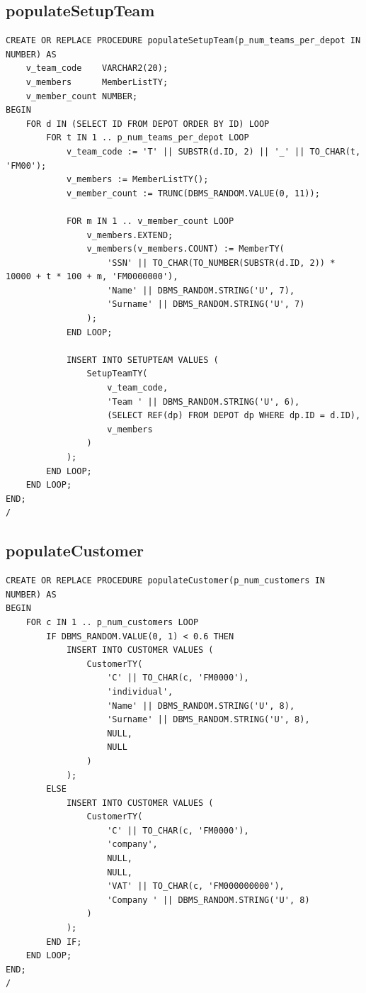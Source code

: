 \subsection*{populateSetupTeam}

\begin{lstlisting}
CREATE OR REPLACE PROCEDURE populateSetupTeam(p_num_teams_per_depot IN NUMBER) AS
    v_team_code    VARCHAR2(20);
    v_members      MemberListTY;
    v_member_count NUMBER;
BEGIN
    FOR d IN (SELECT ID FROM DEPOT ORDER BY ID) LOOP
        FOR t IN 1 .. p_num_teams_per_depot LOOP
            v_team_code := 'T' || SUBSTR(d.ID, 2) || '_' || TO_CHAR(t, 'FM00');
            v_members := MemberListTY();
            v_member_count := TRUNC(DBMS_RANDOM.VALUE(0, 11));

            FOR m IN 1 .. v_member_count LOOP
                v_members.EXTEND;
                v_members(v_members.COUNT) := MemberTY(
                    'SSN' || TO_CHAR(TO_NUMBER(SUBSTR(d.ID, 2)) * 10000 + t * 100 + m, 'FM0000000'),
                    'Name' || DBMS_RANDOM.STRING('U', 7),
                    'Surname' || DBMS_RANDOM.STRING('U', 7)
                );
            END LOOP;

            INSERT INTO SETUPTEAM VALUES (
                SetupTeamTY(
                    v_team_code,
                    'Team ' || DBMS_RANDOM.STRING('U', 6),
                    (SELECT REF(dp) FROM DEPOT dp WHERE dp.ID = d.ID),
                    v_members
                )
            );
        END LOOP;
    END LOOP;
END;
/
\end{lstlisting}

\subsection*{populateCustomer}

\begin{lstlisting}
CREATE OR REPLACE PROCEDURE populateCustomer(p_num_customers IN NUMBER) AS
BEGIN
    FOR c IN 1 .. p_num_customers LOOP
        IF DBMS_RANDOM.VALUE(0, 1) < 0.6 THEN
            INSERT INTO CUSTOMER VALUES (
                CustomerTY(
                    'C' || TO_CHAR(c, 'FM0000'),
                    'individual',
                    'Name' || DBMS_RANDOM.STRING('U', 8),
                    'Surname' || DBMS_RANDOM.STRING('U', 8),
                    NULL,
                    NULL
                )
            );
        ELSE
            INSERT INTO CUSTOMER VALUES (
                CustomerTY(
                    'C' || TO_CHAR(c, 'FM0000'),
                    'company',
                    NULL,
                    NULL,
                    'VAT' || TO_CHAR(c, 'FM000000000'),
                    'Company ' || DBMS_RANDOM.STRING('U', 8)
                )
            );
        END IF;
    END LOOP;
END;
/
\end{lstlisting}

